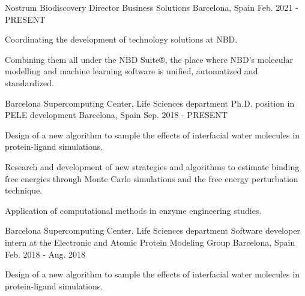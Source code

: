 
\begin{cventries}

  \cventry
    {Nostrum Biodiscovery} %
    {Director Business Solutions} %
    {Barcelona, Spain} %
    {Feb. 2021 - PRESENT} %
    {
      \begin{cvitems} %
        \item {Coordinating the development of technology solutions at NBD.}
        \item {Combining them all under the NBD Suite®, the place where NBD's molecular modelling and machine learning software is unified, automatized and standardized.}
      \end{cvitems}
    }

  \cventry
    {Barcelona Supercomputing Center, Life Sciences department} %
    {Ph.D. position in PELE development} %
    {Barcelona, Spain} %
    {Sep. 2018 - PRESENT} %
    {
      \begin{cvitems} %
        \item {Design of a new algorithm to sample the effects of interfacial water molecules in protein-ligand simulations.}
        \item {Research and development of new strategies and algorithms to estimate binding free energies through Monte Carlo simulations and the free energy perturbation technique.}
        \item {Application of computational methods in enzyme engineering studies.}
      \end{cvitems}
    }

  \cventry
    {Barcelona Supercomputing Center, Life Sciences department} %
    {Software developer intern at the Electronic and Atomic Protein Modeling Group} %
    {Barcelona, Spain} %
    {Feb. 2018 - Aug. 2018} %
    {
      \begin{cvitems} %
        \item {Design of a new algorithm to sample the effects of interfacial water molecules in protein-ligand simulations.}
      \end{cvitems}
    }


\end{cventries}
